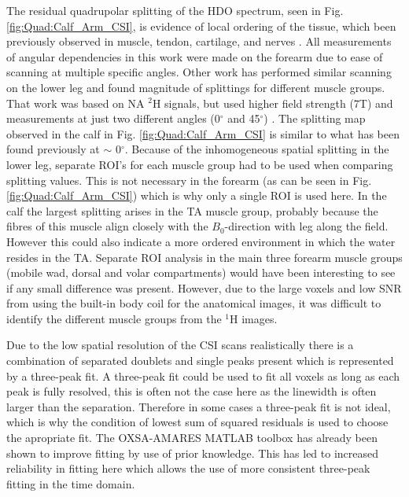 The residual quadrupolar splitting of the \ac{HDO} spectrum, seen in Fig. \ref{fig:Quad:Calf_Arm_CSI}, is evidence of local ordering of the tissue, which been previously observed in muscle, tendon, cartilage, and nerves \cite{Gursan2022ResidualMuscle,Sharf1995DetectionNMR-Spectroscopy,Perea20072HDisc,Eliav2016MultipleMRS}. All measurements of angular dependencies in this work were made on the forearm due to ease of scanning at multiple specific angles. Other work has performed similar scanning on the lower leg and found magnitude of splittings for different muscle groups. That work was based on \ac{NA} $^2$H signals, but used higher field strength (7T) and measurements at just two different angles (0$^\circ$ and 45$^\circ$) \cite{Gursan2022ResidualMuscle}. The splitting map observed in the calf in Fig. \ref{fig:Quad:Calf_Arm_CSI} is similar to what has been found previously at $\sim$ 0$^\circ$. Because of the inhomogeneous spatial splitting in the lower leg, separate \ac{ROI}'s for each muscle group had to be used when comparing splitting values. This is not necessary in the forearm (as can be seen in Fig. \ref{fig:Quad:Calf_Arm_CSI}) which is why only a single  ROI is used here. In the calf the largest splitting arises in the \ac{TA} muscle group, probably because the fibres of this muscle align closely \cite{Gursan2022ResidualMuscle} with the $B_0$-direction with leg along the field. However this could also indicate a more ordered environment in which the water resides in the \ac{TA}. Separate \ac{ROI} analysis in the main three forearm muscle groups (mobile wad, dorsal and volar compartments) would have been interesting to see if any small difference was present. However, due to the large voxels and low \ac{SNR} from using the built-in body coil for the anatomical images, it was difficult to identify the different muscle groups from the $^1$H images.


Due to the low spatial resolution of the \ac{CSI} scans realistically there is a combination of separated doublets and single peaks present which is represented by a three-peak fit. A three-peak fit could be used to fit all voxels as long as each peak is fully resolved, this is often not the case here as the linewidth is often larger than the separation. Therefore in some cases a three-peak fit is not ideal, which is why the condition of lowest sum of squared residuals is used to choose the apropriate fit. The OXSA-AMARES MATLAB toolbox has already been shown to improve fitting by use of prior knowledge. This has led to increased reliability in fitting here which allows the use of more consistent three-peak fitting in the time domain. 

